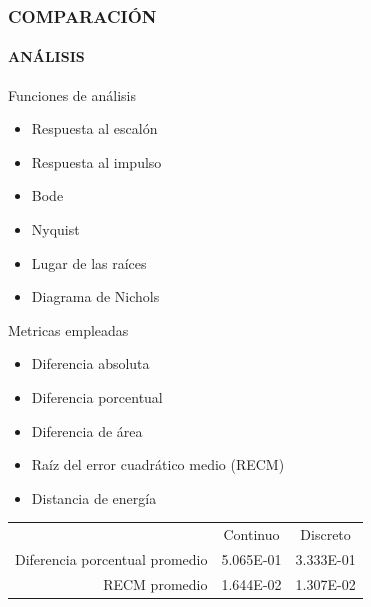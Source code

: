 \documentclass[usenames,xcolor={dvipsnames, table}]{beamer}
\begin{document}
\begin{frame}
	\frametitle{COMPARACIÓN}
	\framesubtitle{ANÁLISIS}
	\vspace{21pt}
	\small
	\begin{block}{Funciones de análisis}
		\footnotesize
		\begin{multicols}{2}
		\begin{itemize}
			\item Respuesta al escalón
			\item Respuesta al impulso
			\item Bode
			\item Nyquist
			\item Lugar de las raíces 
			\item Diagrama de Nichols
		\end{itemize}
	\end{multicols}
	\end{block}

	\begin{block}{Metricas empleadas}
		\footnotesize
		\begin{multicols}{2}
		\begin{itemize}
			\item Diferencia absoluta
			\item Diferencia porcentual
			\item Diferencia de área
			\item Raíz del error cuadrático medio (RECM)
			\item Distancia de energía
		\end{itemize}
	\end{multicols}
	\end{block}

	\vspace{-5pt}
	\begin{table}
		\begin{tabular}{rcc}
										& Continuo 			& Discreto 			\\
		Diferencia porcentual promedio	& \num{5.065E-01}	& \num{3.333E-01}	\\
		RECM promedio					& \num{1.644E-02}	& \num{1.307E-02} 	\\
		\end{tabular}
	\end{table}
\end{frame}
\end{document}
